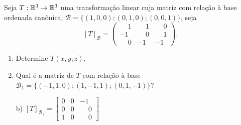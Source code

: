 \documentclass[12pt]{exam}
\begin{document}
\begin{exercicio}
    Seja $T : \mathbb{R}^3 \to \mathbb{R}^3$ uma transformação linear cuja matriz com relação à base ordenada canônica, $\mathcal{B} = \{(1,0,0); (0,1,0); (0,0,1)\}$, seja
    \[
    [T]_\mathcal{B} = \begin{pmatrix}
        \phantom{-}1 & \phantom{-}1 & \phantom{-}0\\
        -1 & \phantom{-}0 & \phantom{-}1\\
        \phantom{-}0 & -1 & -1
    \end{pmatrix}.
    \]
    \begin{enumerate}[label={\alph*})]
        \item Determine $T(x,y,z)$.

        \item Qual é a matriz de $T$ com relação à base $\mathcal{B}_1 = \{(-1,1,0);(1,-1,1);(0,1,-1)\}$?

    \end{enumerate}
    \begin{solucao}
        \begin{enumerate}
            \item[b)] $[T]_{\mathcal{B}_1} = \begin{bmatrix}
                0 & 0 & -1\\
                0 & 0 & \phantom{-}0\\
                1 & 0 & \phantom{-}0
            \end{bmatrix}$

        \end{enumerate}
    \end{solucao}
\end{exercicio}
\end{document}
